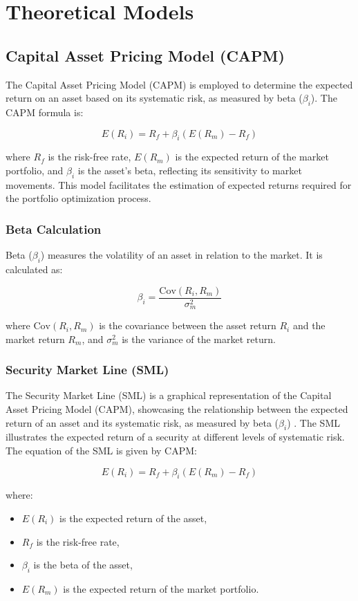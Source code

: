\section{Theoretical Models}
\subsection{Capital Asset Pricing Model (CAPM)}
The Capital Asset Pricing Model (CAPM) is employed to determine the expected return on an asset based on its systematic risk, as measured by beta ($\beta_i$). The CAPM formula is:

\[
E(R_i) = R_f + \beta_i (E(R_m) - R_f)
\]

where \( R_f \) is the risk-free rate, \( E(R_m) \) is the expected return of the market portfolio, and \( \beta_i \) is the asset’s beta, reflecting its sensitivity to market movements. This model facilitates the estimation of expected returns required for the portfolio optimization process.

\subsubsection{Beta Calculation}
Beta ($\beta_i$) measures the volatility of an asset in relation to the market. It is calculated as:

\[
\beta_i = \frac{\text{Cov}(R_i, R_m)}{\sigma^2_m}
\]

where \(\text{Cov}(R_i, R_m)\) is the covariance between the asset return \( R_i \) and the market return \( R_m \), and \( \sigma^2_m \) is the variance of the market return.

\subsubsection{Security Market Line (SML)}
The Security Market Line (SML) is a graphical representation of the Capital Asset Pricing Model (CAPM), showcasing the relationship between the expected return of an asset and its systematic risk, as measured by beta ($\beta_i$) \citep{wikiSML}. The SML illustrates the expected return of a security at different levels of systematic risk. The equation of the SML is given by CAPM:

\[
E(R_i) = R_f + \beta_i (E(R_m) - R_f)
\]

where:
\begin{itemize}
    \item \( E(R_i) \) is the expected return of the asset,
    \item \( R_f \) is the risk-free rate,
    \item \( \beta_i \) is the beta of the asset,
    \item \( E(R_m) \) is the expected return of the market portfolio.
\end{itemize}

